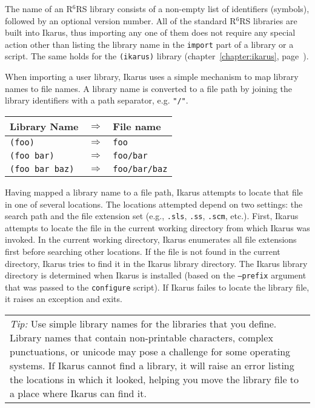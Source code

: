 \documentclass[onecolumn, 12pt, twoside, openright, dvipdfm]{book}
\newcommand{\rnrs}[1]{R$^{\mathrm{#1}}$RS}
\newcommand{\BoxedText}[2]{
  \vspace{.05in}
  \begin{center}
    \begin{tabular}{|p{4.6in}|} {\large \emph{#1}} #2 \end{tabular}
  \end{center}
  \vspace{.05in}
}
\begin{document}
The name of an \rnrs{6} library consists of a non-empty list of
identifiers (symbols), followed by an optional version number.  All
of the standard \rnrs{6} libraries are built into Ikarus, thus
importing any one of them does not require any special action other
than listing the library name in the \texttt{import} part of a
library or a script.  The same holds for the \texttt{(ikarus)}
library (chapter~\ref{chapter:ikarus},
page~\pageref{chapter:ikarus}).

When importing a user library, Ikarus uses a simple mechanism
to map library names to file names.  A library name is converted to
a file path by joining the library identifiers with a path
separator, e.g. \verb|"/"|.

\begin{center}
\begin{tabular}{lcl}
  Library Name & \hspace{2em}$\Rightarrow$\hspace{2em} & File name \\
  \hline
  \verb|(foo)|         & $\Rightarrow$ & \verb|foo| \\
  \verb|(foo bar)|     & $\Rightarrow$ & \verb|foo/bar| \\
  \verb|(foo bar baz)| & $\Rightarrow$ & \verb|foo/bar/baz| 
\end{tabular}
\end{center}


Having mapped a library name to a file path, Ikarus attempts to
locate that file in one of several locations.  The locations
attempted depend on two settings: the search path and the file
extension set (e.g., \verb|.sls|, \verb|.ss|, \verb|.scm|, etc.).
First, Ikarus attempts to locate the file in the current working
directory from which Ikarus was invoked.  In the current working
directory, Ikarus enumerates all file extensions first before
searching other locations.  If the file is not found in the current
directory, Ikarus tries to find it in the Ikarus library directory.
The Ikarus library directory is determined when Ikarus is installed
(based on the \texttt{--prefix} argument that was passed to the
\texttt{configure} script).  If Ikarus failes to locate the library
file, it raises an exception and exits. 


\BoxedText{Tip:}{Use simple library names for the libraries that
you define.  Library names that contain non-printable characters,
complex punctuations, or unicode may pose a challenge for some
operating systems.  If Ikarus cannot find a library, it will raise
an error listing the locations in which it looked, helping you move
the library file to a place where Ikarus can find it.}
\end{document}
